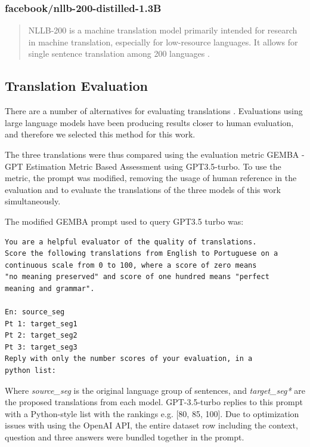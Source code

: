 \documentclass{article}
\begin{document}
\subsubsection{facebook/nllb-200-distilled-1.3B}

\begin{quote}
NLLB-200 is a machine translation model primarily intended for research in
machine translation, especially for low-resource languages. It allows for
single sentence translation among 200 languages \cite{costa2022no}.
\end{quote}

\subsection{Translation Evaluation}
\label{subsec:translation-evaluation}

There are a number of alternatives for evaluating translations
\cite{lee2023survey}. Evaluations using large language models have been producing
results closer to human evaluation, and therefore we selected this method for
this work.

The three translations were thus compared using the evaluation metric GEMBA -
GPT Estimation Metric Based Assessment \cite{kocmi2023large} using GPT3.5-turbo.
To use the metric, the prompt was modified, removing the usage of human
reference in the evaluation and to evaluate the translations of the three models
of this work simultaneously.

The modified GEMBA prompt used to query GPT3.5 turbo was:

\begin{verbatim}
You are a helpful evaluator of the quality of translations.
Score the following translations from English to Portuguese on a
continuous scale from 0 to 100, where a score of zero means
"no meaning preserved" and score of one hundred means "perfect
meaning and grammar".

En: source_seg
Pt 1: target_seg1
Pt 2: target_seg2
Pt 3: target_seg3
Reply with only the number scores of your evaluation, in a 
python list:
\end{verbatim}

Where \emph{source\_seg} is the original language group of sentences, and
\emph{target\_seg*} are the proposed translations from each model. GPT-3.5-turbo
replies to this prompt with a Python-style list with the rankings e.g. [80, 85,
100]. Due to optimization issues with using the OpenAI API, the entire dataset
row including the context, question and three answers were bundled together in
the prompt.
\end{document}
